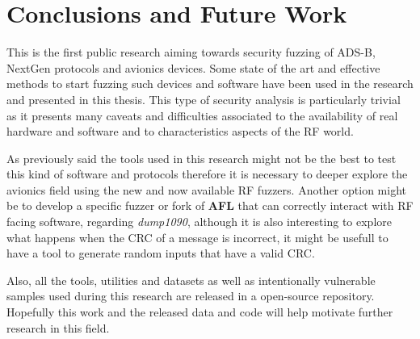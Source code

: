 \documentclass[../main.tex]{subfiles}
\begin{document}
\chapter{Conclusions and Future Work}
\label{chap:futurework}

This is the first public research aiming towards security fuzzing of ADS-B, NextGen protocols and avionics devices.
Some state of the art and effective methods to start fuzzing such devices and software have been used in the research and presented in this thesis. This type of security analysis is particularly trivial as it presents many caveats and difficulties associated to the availability of real hardware and software and to characteristics aspects of the RF world.

As previously said the tools used in this research might not be the best to test this kind of software and protocols therefore it is necessary to deeper explore the avionics field using the new and now available RF fuzzers. Another option might be to develop a specific fuzzer or fork of \textbf{AFL} that can correctly interact with RF facing software, regarding \textit{dump1090}, although it is also interesting to explore what happens when the CRC of a message is incorrect, it might be usefull to have a tool to generate random inputs that have a valid CRC.

Also, all the tools, utilities and datasets as well as intentionally vulnerable samples used during this research are released in a open-source repository.
Hopefully this work and the released data and code will help motivate
further research in this field.

\end{document}
